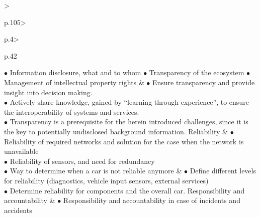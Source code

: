 \begin{table}[t]
\begin{small}
\begin{supertabular}{%
		>{\raggedright}p{.105\textwidth}>{\raggedright}p{.4\textwidth}>{\raggedright}p{.42\textwidth}}
				\noindent $\bullet$ Information disclosure, what and to whom
				\noindent $\bullet$ Transparency of the ecosystem
				\noindent $\bullet$ Management of intellectual property rights
			& 
				\noindent $\bullet$ Ensure transparency and provide insight into decision making.\\
				\noindent $\bullet$ Actively share knowledge, gained by \enquote{learning through experience}, to ensure the interoperability of systems and services.\\
				\noindent $\bullet$ Transparency is a prerequisite for the herein introduced challenges, since it is the key to potentially undisclosed background information.
 			 \tabularnewline \hline %
			Reliability & 
				\noindent $\bullet$ Reliability of required networks and solution for the case when the network is unavailable\\
				\noindent $\bullet$ Reliability of sensors, and need for redundancy\\
				\noindent $\bullet$ Way to determine when a car is not reliable anymore
			& 
				\noindent $\bullet$ Define different levels for reliability (diagnostics, vehicle input sensors, external services)\\
				\noindent $\bullet$ Determine reliability for components and the overall car. 
 			 \tabularnewline \hline %
			Responsibility and accountability & 
				\noindent $\bullet$ Responsibility and accountability in case of incidents and accidents\\

\end{supertabular}
\end{small}
\end{table}
